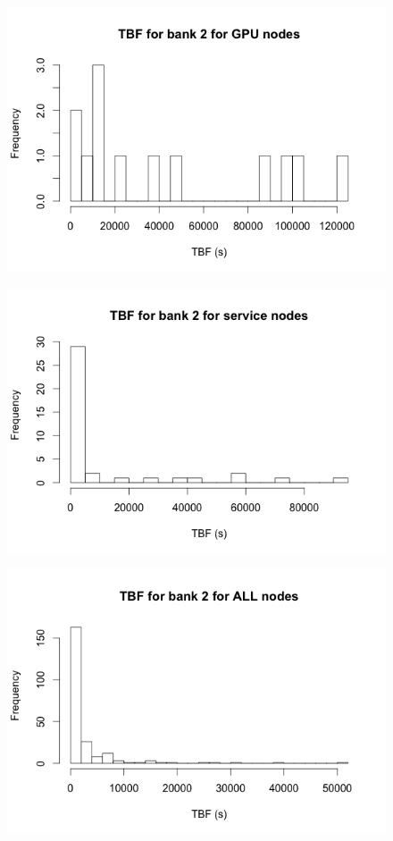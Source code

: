 \begin{figure}[h]
\centering
\includegraphics{images/tbf_2_g.png}
\end{figure}

\begin{figure}[h]
\centering
\includegraphics{images/tbf_2_s.png}
\end{figure}

\begin{figure}[h]
\centering
\includegraphics{images/tbf_2_a.png}
\end{figure}

